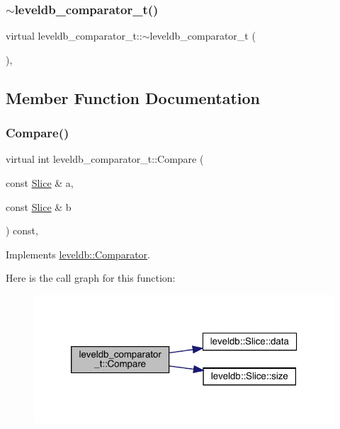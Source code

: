 \subsubsection{\texorpdfstring{$\sim$leveldb\_comparator\_t()}{~leveldb\_comparator\_t()}}
{\footnotesize\ttfamily virtual leveldb\+\_\+comparator\+\_\+t\+::$\sim$leveldb\+\_\+comparator\+\_\+t (\begin{DoxyParamCaption}{ }\end{DoxyParamCaption})\hspace{0.3cm}{\ttfamily [inline]}, {\ttfamily [virtual]}}



\subsection{Member Function Documentation}
\mbox{\label{structleveldb__comparator__t_abad34abeefd52bcfd421e14f426f6d05}} 
\subsubsection{\texorpdfstring{Compare()}{Compare()}}
{\footnotesize\ttfamily virtual int leveldb\+\_\+comparator\+\_\+t\+::\+Compare (\begin{DoxyParamCaption}\item[{const \mbox{\hyperlink{classleveldb_1_1_slice}{Slice}} \&}]{a,  }\item[{const \mbox{\hyperlink{classleveldb_1_1_slice}{Slice}} \&}]{b }\end{DoxyParamCaption}) const\hspace{0.3cm}{\ttfamily [inline]}, {\ttfamily [virtual]}}



Implements \mbox{\hyperlink{structleveldb_1_1_comparator_a05dae6edcad3c7db23827c0233d74039}{leveldb\+::\+Comparator}}.

Here is the call graph for this function\+:
\nopagebreak
\begin{figure}[H]
\begin{center}
\leavevmode
\includegraphics[width=320pt]{structleveldb__comparator__t_abad34abeefd52bcfd421e14f426f6d05_cgraph}
\end{center}
\end{figure}
\mbox{\label{structleveldb__comparator__t_ad5bc952c5129d060c1ffe7a830eb3820}} 
